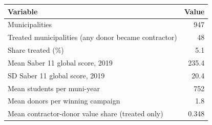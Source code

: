 \begin{tabular}{lr}
\toprule
Variable & Value \\
\midrule
Municipalities & 947 \\
Treated municipalities (any donor became contractor) & 48 \\
Share treated (\%) & 5.1 \\
Mean Saber 11 global score, 2019 & 235.4 \\
SD Saber 11 global score, 2019 & 20.4 \\
Mean students per muni-year & 752 \\
Mean donors per winning campaign & 1.8 \\
Mean contractor-donor value share (treated only) & 0.348 \\
\bottomrule
\end{tabular}
